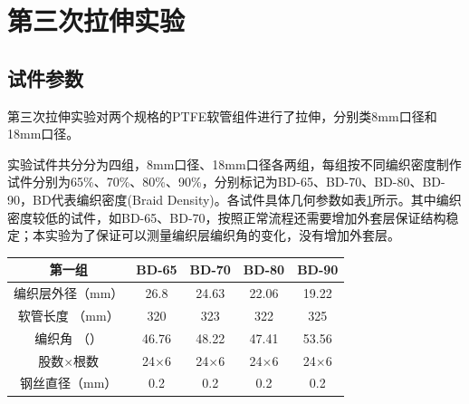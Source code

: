 \newpage
\section{第三次拉伸实验}
\subsection{试件参数}
  第三次拉伸实验对两个规格的PTFE软管组件进行了拉伸，分别类8mm口径和18mm口径。
  
  实验试件共分分为四组，8mm口径、18mm口径各两组，每组按不同编织密度制作试件分别为65\%、70\%、80\%、90\%，分别标记为BD-65、BD-70、BD-80、BD-90，BD代表编织密度(Braid Density)。各试件具体几何参数如表\ref{tab:hose-specimen-III-1}所示。其中编织密度较低的试件，如BD-65、BD-70，按照正常流程还需要增加外套层保证结构稳定；本实验为了保证可以测量编织层编织角的变化，没有增加外套层。
  
  
  
  \begin{table}[!htb]
  	\centering
  	\label{tab:hose-specimen-III-1}
  	\begin{tabular*}{0.8\textwidth}{@{\extracolsep{\fill}}>{\hspace{0.5cm}}ccccc}
  		\toprule
  		\textbf{第一组}&     BD-65     &     BD-70     &     BD-80     &     BD-90     \\ \midrule
  		编织层外径（mm）  & 26.8         &     24.63     &     22.06     &     19.22       \\
  		软管长度 （mm）    & 320          &      323      &      322      &      325       \\
  		编织角 （\textdegree）   & 46.76 &     48.22     &     47.41     &     53.56     \\
  		股数$ \times $根数          & 24$ \times $6 & 24$ \times $6 & 24$ \times $6 & 24$ \times $6 \\
  		钢丝直径（mm）                &      0.2      &      0.2      &      0.2      &      0.2      \\ \bottomrule
  	\end{tabular*} 
  \end{table}
  
